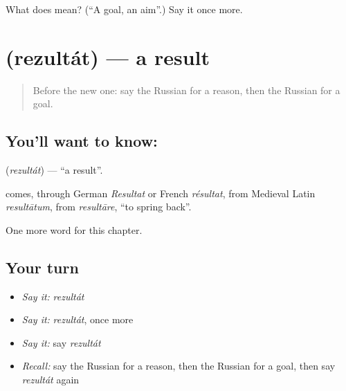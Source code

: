 \begin{tcolorbox}[breakable,colback=teal!4,colframe=teal!35!black,title={Before you move on}]
What does  mean? (\textquotedblleft{}A goal, an aim\textquotedblright{}.) Say it once more.
\end{tcolorbox}
\section[\texorpdfstring{\ru{результат} (rezultát)}{результат (rezultát)}]{ (rezultát) — a result}

\label{lesson:RU-C185-rezultat}



\begin{quote}
Before the new one: say the Russian for a reason, then the Russian for a goal.
\end{quote}

\subsection*{You'll want to know: }
\textbf{} (\emph{rezultát}) — \textquotedblleft{}a result\textquotedblright{}.

\begin{cousinweb}
\textbf{} comes, through German \emph{Resultat} or French \emph{résultat}, from Medieval Latin \emph{resultātum}, from \emph{resultāre}, \textquotedblleft{}to spring back\textquotedblright{}.
\end{cousinweb}

\begin{grammarlens}[title={What you've built}]
One more word for this chapter.
\end{grammarlens}

\subsection*{Your turn}
\begin{itemize}
\raggedright
  \item \emph{Say it:} \emph{rezultát}
  \item \emph{Say it:} \emph{rezultát}, once more
  \item \emph{Say it:} say \emph{rezultát}
  \item \emph{Recall:} say the Russian for a reason, then the Russian for a goal, then say \emph{rezultát} again
\end{itemize}

